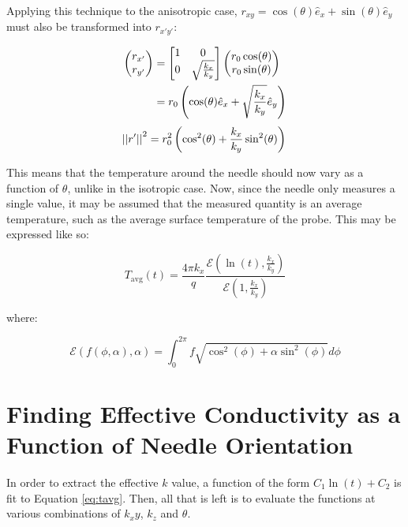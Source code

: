 Applying this technique to the anisotropic case, \(r_{xy} = \cos(\theta) \hat{e}_x + \sin(\theta) \hat{e}_y \) must also be transformed
into \(r_{x'y'}\):

\begin{align*}
    \begin{pmatrix}r_{x'} \\ r_{y'}\end{pmatrix} &=
    \begin{bmatrix}1 & 0\\ 0 & \sqrt{\frac{k_x}{k_y}} \end{bmatrix}\begin{pmatrix}r_0\cos(\theta) \\ r_0\sin(\theta)\end{pmatrix}\\
    &= r_0\left(\cos(\theta) \hat{e}_x + \sqrt{\frac{k_x}{k_y}} \hat{e}_y \right)\\
\end{align*}
\begin{equation}
    \left|\left|{r'}\right|\right|^2 = r_0^2 \left(\cos^2(\theta) + \frac{k_x}{k_y}\sin^2(\theta) \right)\\
\end{equation}

This means that the temperature around the needle should now vary as a function
of \(\theta\), unlike in the isotropic case. Now, since the needle only measures
a single value, it may be assumed that the measured quantity is an
average temperature, such as the average surface temperature of the probe.  This
may be expressed like so:

\begin{equation}
\label{eq:tavg}
T_{\textrm{avg}}(t) = \frac{4\pi k_x}{q} \frac{\mathcal{E}(\ln(t), \frac{k_x}{k_y})}{\mathcal{E}(1, \frac{k_x}{k_y})}
\end{equation}

where:

\begin{equation}
\mathcal{E}(f(\phi, \alpha), \alpha) = \int_0^{2\pi} f\sqrt{\cos^2(\phi) + \alpha\sin^2(\phi)} d\phi
\end{equation}

\section{Finding Effective Conductivity as a Function of Needle Orientation}

In order to extract the effective \(k\) value, a function of the form
\(C_1 \ln(t) + C_2\) is fit to Equation \ref{eq:tavg}. Then, all that is left is to evaluate the functions at various combinations of
\(k_xy\), \(k_z\) and \(\theta\).

